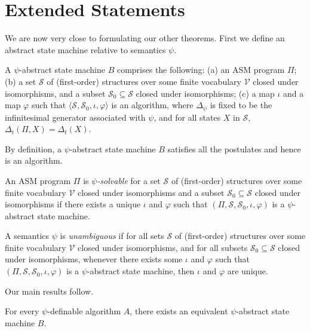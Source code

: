 \documentclass[envcountsame]{llncs}
\newcommand{\St}{\ensuremath{\mathcal {S}}}
\newcommand{\In}{\St_0}
\newcommand{\U}{\ensuremath{\mathcal {V}}}
\newcommand{\gen}[1]{\Delta_t(#1)}
\newcommand\Deltapsi{\Delta_\psi}
\newcommand{\itm}[1]{\mbox{\rm(}#1\mbox{\rm)}}
\begin{document}
\section{Extended Statements}



We are now very close to formulating our other theorems. First we define an
abstract state machine relative to semantics $\psi$.


\begin{definition} A $\psi$-abstract state machine $B$ comprises the following:
\itm{a} an ASM program $\Pi$;
\itm{b} a set $\St$ of (first-order) structures over some finite
    vocabulary $\U$ closed under isomorphisms, and a subset $\In \subseteq \St$ closed under isomorphisms;
\itm{c} a map $\iota$ and a map $\varphi$ such that  $\langle \St, \In, \iota, \varphi \rangle$ is an algorithm, where $\Deltapsi$ is fixed to be the infinitesimal
generator associated with $\psi$, and
for all
states $X$ in $\St$,
$\gen{\Pi,X} = \gen{X}$.
\end{definition}


By definition, a  $\psi$-abstract state machine $B$ satisfies all the
postulates and hence is an algorithm.

\begin{definition}
An ASM program $\Pi$ is \emph{$\psi$-solvable} for a set $\St$ of (first-order) structures over some finite
    vocabulary $\U$ closed under isomorphisms and a subset $\In
    \subseteq \St$ closed under isomorphisms if there exists a unique
    $\iota$ and $\varphi$ such that $(\Pi,\St,\In,\iota,\varphi)$ is a $\psi$-abstract
    state machine.
\end{definition}


\begin{definition}
A semantics $\psi$ is \emph{unambiguous} if for all sets $\St$ of (first-order) structures over some finite
    vocabulary $\U$ closed under isomorphisms, and for all subsets $\In
    \subseteq \St$ closed under isomorphisms, whenever there exists some $\iota$
    and $\varphi$ such that $(\Pi,\St,\In,\iota,\varphi)$ is a $\psi$-abstract
    state machine, then $\iota$ and $\varphi$ are unique.
\end{definition}

Our main results follow.


\begin{theorem} \label{thone}
  For every $\psi$-definable algorithm $A$, there exists an equivalent $\psi$-abstract state machine $B$.
\end{theorem}
\end{document}
